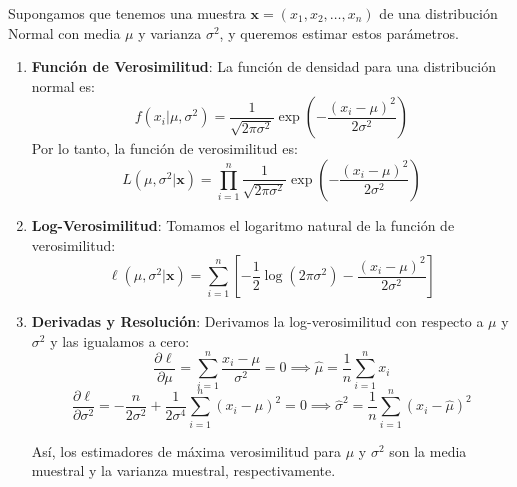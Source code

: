 \documentclass[
  letterpaper,
  DIV=11,
  numbers=noendperiod]{scrreprt}
\begin{document}
\begin{tcolorbox}[enhanced jigsaw, arc=.35mm, breakable, coltitle=black, left=2mm, opacityback=0, bottomtitle=1mm, colbacktitle=quarto-callout-tip-color!10!white, title=\textcolor{quarto-callout-tip-color}{\faLightbulb}\hspace{0.5em}{Ejemplo, distribución Normal}, titlerule=0mm, colback=white, colframe=quarto-callout-tip-color-frame, bottomrule=.15mm, rightrule=.15mm, opacitybacktitle=0.6, toptitle=1mm, toprule=.15mm, leftrule=.75mm]

Supongamos que tenemos una muestra
\(\mathbf{x} = (x_1, x_2, \ldots, x_n)\) de una distribución Normal con
media \(\mu\) y varianza \(\sigma^2\), y queremos estimar estos
parámetros.

\begin{enumerate}
\def\labelenumi{\arabic{enumi}.}
\item
  \textbf{Función de Verosimilitud}: La función de densidad para una
  distribución normal es: \[
  f(x_i|\mu, \sigma^2) = \frac{1}{\sqrt{2\pi\sigma^2}} \exp\left(-\frac{(x_i - \mu)^2}{2\sigma^2}\right)
  \] Por lo tanto, la función de verosimilitud es: \[
  L(\mu, \sigma^2| \mathbf{x}) = \prod_{i=1}^n \frac{1}{\sqrt{2\pi\sigma^2}} \exp\left(-\frac{(x_i - \mu)^2}{2\sigma^2}\right)
  \]
\item
  \textbf{Log-Verosimilitud}: Tomamos el logaritmo natural de la función
  de verosimilitud: \[
  \ell(\mu, \sigma^2|\mathbf{x}) = \sum_{i=1}^n \left[ -\frac{1}{2} \log(2\pi\sigma^2) - \frac{(x_i - \mu)^2}{2\sigma^2} \right]
  \]
\item
  \textbf{Derivadas y Resolución}: Derivamos la log-verosimilitud con
  respecto a \(\mu\) y \(\sigma^2\) y las igualamos a cero: \[
  \frac{\partial \ell}{\partial \mu} = \sum_{i=1}^n \frac{x_i - \mu}{\sigma^2} = 0 \implies \hat{\mu} = \frac{1}{n} \sum_{i=1}^n x_i
  \] \[
  \frac{\partial \ell}{\partial \sigma^2} = -\frac{n}{2\sigma^2} + \frac{1}{2\sigma^4} \sum_{i=1}^n (x_i - \mu)^2 = 0 \implies \hat{\sigma}^2 = \frac{1}{n} \sum_{i=1}^n (x_i - \hat{\mu})^2
  \]

  Así, los estimadores de máxima verosimilitud para \(\mu\) y
  \(\sigma^2\) son la media muestral y la varianza muestral,
  respectivamente.
\end{enumerate}

\end{tcolorbox}
\end{document}
